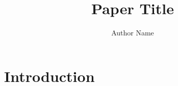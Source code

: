 \documentclass{article}
\title{Paper Title}
\author{Author Name}
\begin{document}
\maketitle

\begin{abstract}
\end{abstract}

\section{Introduction}
\end{document}
